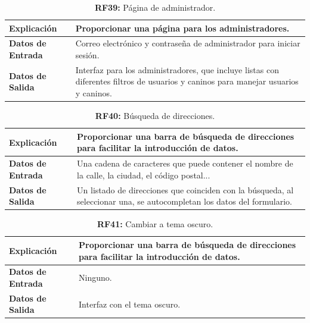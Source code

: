 \documentclass[a4paper, 12pt]{article}
\begin{document}
\begin{table}[H]
\captionsetup{justification=raggedright,singlelinecheck=false}
\caption{\textbf{RF39:} Página de administrador.}
\label{tab:RF39}
	\begin{tabular}{|m{5cm}|m{10cm}|}
	\hline
	\textbf{Explicación} & Proporcionar una página para los administradores. \\ 
	\hline
	\textbf{Datos de Entrada} & Correo electrónico y contraseña de administrador para iniciar sesión. \\ 
	\hline
	\textbf{Datos de Salida} & Interfaz para los administradores, que incluye listas con diferentes filtros de usuarios y caninos para manejar usuarios y caninos. \\ 
	\hline
\end{tabular}
\end{table}

\begin{table}[H]
\captionsetup{justification=raggedright,singlelinecheck=false}
\caption{\textbf{RF40:} Búsqueda de direcciones.}
\label{tab:RF40}
	\begin{tabular}{|m{5cm}|m{10cm}|}
	\hline
	\textbf{Explicación} & Proporcionar una barra de búsqueda de direcciones para facilitar la introducción de datos. \\ 
	\hline
	\textbf{Datos de Entrada} & Una cadena de caracteres que puede contener el nombre de la calle, la ciudad, el código postal... \\ 
	\hline
	\textbf{Datos de Salida} & Un listado de direcciones que coinciden con la búsqueda, al seleccionar una, se autocompletan los datos del formulario. \\ 
	\hline
\end{tabular}
\end{table}

\begin{table}[H]
\captionsetup{justification=raggedright,singlelinecheck=false}
\caption{\textbf{RF41:} Cambiar a tema oscuro.}
\label{tab:RF41}
	\begin{tabular}{|m{5cm}|m{10cm}|}
	\hline
	\textbf{Explicación} & Proporcionar una barra de búsqueda de direcciones para facilitar la introducción de datos. \\ 
	\hline
	\textbf{Datos de Entrada} & Ninguno.\\ 
	\hline
	\textbf{Datos de Salida} & Interfaz con el tema oscuro.  \\ 
	\hline
\end{tabular}
\end{table}
\end{document}
